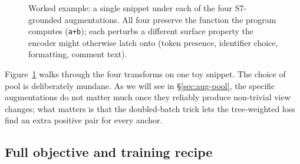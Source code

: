 ﻿\documentclass[11pt]{article}
\begin{document}
\begin{figure}[t]
\centering\small
{}
\caption{\label{fig:aug-example}
Worked example: a single snippet under each of the four S7-grounded
augmentations. All four preserve the function the program computes
(\texttt{a+b}); each perturbs a different surface property the
encoder might otherwise latch onto (token presence, identifier
choice, formatting, comment text).}
\end{figure}

Figure~\ref{fig:aug-example} walks through the four transforms on
one toy snippet. The choice of pool is deliberately mundane. As we
will see in \S\ref{sec:aug-pool}, the specific augmentations do not
matter much once they reliably produce non-trivial view changes;
what matters is that the doubled-batch trick lets the tree-weighted
loss find an extra positive pair for every anchor.

\subsection{Full objective and training recipe}
\label{sec:method-train}
\end{document}

